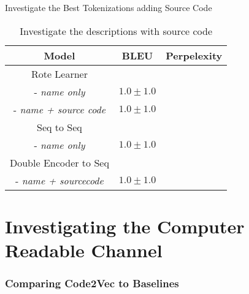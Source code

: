 Investigate the Best Tokenizations adding Source Code
\begin{table}[h!]
\begin{center}
\begin{tabular}{ c | c | c }
    Model                               & BLEU             & Perpelexity \\
    \hline
    \hline
    Rote Learner                        &                  & \\    
    - \textit{name only}                & $1.0 \pm 1.0 $   & \\
    - \textit{name + source code}       & $1.0 \pm 1.0 $   & \\
    \hline
    \hline
    Seq to Seq                          &                  &  \\
    - \textit{name only}                & $1.0 \pm 1.0 $   & \\
    \hline
    \hline
    Double Encoder to Seq               &                  &  \\
    - \textit{name + sourcecode}        & $1.0 \pm 1.0 $   & \\
    \hline
\end{tabular}
\caption {Investigate the descriptions with source code}
\label{table:human_source_code}
\end{center}
\end{table}





\section{Investigating the Computer Readable Channel} %
\label{sec:investigating_the_computer_channel}

\subsubsection{Comparing Code2Vec to Baselines} %
\label{ssub:comparing_code2vec_to_baselines}


